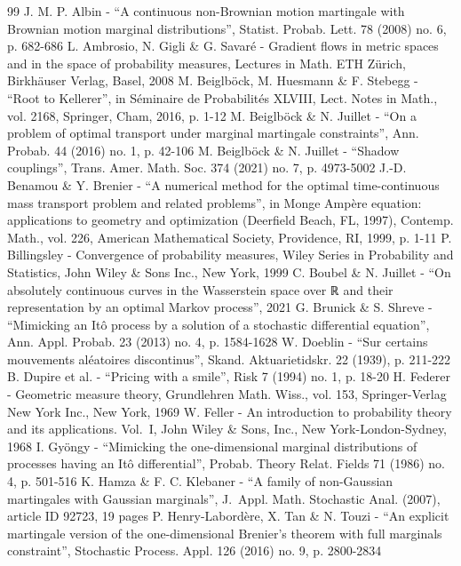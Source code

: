 \begin{thebibliography}{99}
 J. M. P. Albin - “A continuous non-Brownian motion martingale with Brownian motion marginal distributions”, Statist. Probab. Lett. 78 (2008) no. 6, p. 682-686
 L. Ambrosio, N. Gigli \& G. Savaré - Gradient flows in metric spaces and in the space of probability measures, Lectures in Math. ETH Zürich, Birkhäuser Verlag, Basel, 2008
 M. Beiglböck, M. Huesmann \& F. Stebegg - “Root to Kellerer”, in Séminaire de Probabilités XLVIII, Lect. Notes in Math., vol. 2168, Springer, Cham, 2016, p. 1-12
 M. Beiglböck \& N. Juillet - “On a problem of optimal transport under marginal martingale constraints”, Ann. Probab. 44 (2016) no. 1, p. 42-106
 M. Beiglböck \& N. Juillet - “Shadow couplings”, Trans. Amer. Math. Soc. 374 (2021) no. 7, p. 4973-5002
 J.-D. Benamou \& Y. Brenier - “A numerical method for the optimal time-continuous mass transport problem and related problems”, in Monge Ampère equation: applications to geometry and optimization (Deerfield Beach, FL, 1997), Contemp. Math., vol. 226, American Mathematical Society, Providence, RI, 1999, p. 1-11
 P. Billingsley - Convergence of probability measures, Wiley Series in Probability and Statistics, John Wiley \& Sons Inc., New York, 1999
 C. Boubel \& N. Juillet - “On absolutely continuous curves in the Wasserstein space over ℝ and their representation by an optimal Markov process”, 2021
 G. Brunick \& S. Shreve - “Mimicking an Itô process by a solution of a stochastic differential equation”, Ann. Appl. Probab. 23 (2013) no. 4, p. 1584-1628
 W. Doeblin - “Sur certains mouvements aléatoires discontinus”, Skand. Aktuarietidskr. 22 (1939), p. 211-222
 B. Dupire et al. - “Pricing with a smile”, Risk 7 (1994) no. 1, p. 18-20
 H. Federer - Geometric measure theory, Grundlehren Math. Wiss., vol. 153, Springer-Verlag New York Inc., New York, 1969
 W. Feller - An introduction to probability theory and its applications. Vol. I, John Wiley \& Sons, Inc., New York-London-Sydney, 1968
 I. Gyöngy - “Mimicking the one-dimensional marginal distributions of processes having an Itô differential”, Probab. Theory Relat. Fields 71 (1986) no. 4, p. 501-516
 K. Hamza \& F. C. Klebaner - “A family of non-Gaussian martingales with Gaussian marginals”, J. Appl. Math. Stochastic Anal. (2007), article ID 92723, 19 pages
 P. Henry-Labordère, X. Tan \& N. Touzi - “An explicit martingale version of the one-dimensional Brenier’s theorem with full marginals constraint”, Stochastic Process. Appl. 126 (2016) no. 9, p. 2800-2834

\end{thebibliography}
